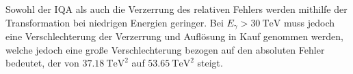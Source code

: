 Sowohl der IQA als auch die Verzerrung des relativen Fehlers werden mithilfe der Transformation bei niedrigen Energien geringer.
Bei $E_\gamma > \SI{30}{\tera\eV}$ muss jedoch eine Verschlechterung der Verzerrung und Auflösung in Kauf genommen werden, welche jedoch eine große Verschlechterung
bezogen auf den absoluten Fehler bedeutet, der von $\SI{37.18}{\tera\eV\squared}$ auf $\SI{53.65}{\tera\eV\squared}$ steigt.
